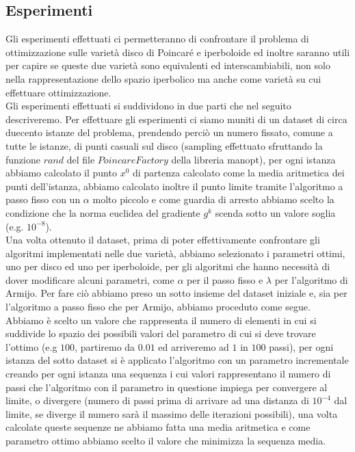 \documentclass[a4paper, 12pt]{article}
\begin{document}
\subsection{Esperimenti}
Gli esperimenti effettuati ci permetteranno di confrontare il problema di ottimizzazione sulle varietà disco di Poincaré e iperboloide ed inoltre saranno utili per capire se queste due varietà sono equivalenti ed interscambiabili, non solo nella rappresentazione dello spazio iperbolico ma anche come varietà su cui effettuare ottimizzazione.\\
Gli esperimenti effettuati si suddividono in due parti che nel seguito descriveremo. Per effettuare gli esperimenti ci siamo muniti di un dataset di circa duecento istanze del problema, prendendo perciò un numero fissato, comune a tutte le istanze, di punti casuali sul disco (sampling effettuato sfruttando la funzione $rand$ del file $PoincareFactory$ della libreria manopt), per ogni istanza abbiamo calcolato il punto $x^0$ di partenza calcolato come la media aritmetica dei punti dell'istanza, abbiamo calcolato inoltre il punto limite tramite l'algoritmo a passo fisso con un $\alpha$ molto piccolo e come guardia di arresto abbiamo scelto la condizione che la norma euclidea del gradiente $g^k$ scenda sotto un valore soglia (e.g. $10^{-8}$).\\
Una volta ottenuto il dataset, prima di poter effettivamente confrontare gli algoritmi implementati nelle due varietà, abbiamo selezionato i parametri ottimi, uno per disco ed uno per iperboloide, per gli algoritmi che hanno necessità di dover modificare alcuni parametri, come $\alpha$ per il passo fisso e $\lambda$ per l'algoritmo di Armijo. Per fare ciò abbiamo preso un sotto insieme del dataset iniziale e, sia per l'algoritmo a passo fisso che per Armijo, abbiamo proceduto come segue. Abbiamo è scelto un valore che rappresenta il numero di elementi in cui si suddivide lo spazio dei possibili valori del parametro di cui si deve trovare  l'ottimo (e.g $100$, partiremo da $0.01$ ed arriveremo ad $1$ in $100$ passi), per ogni istanza del sotto dataset si è applicato l'algoritmo con un parametro incrementale creando per ogni istanza una sequenza i cui valori rappresentano il numero di passi che l'algoritmo con il parametro in questione impiega per convergere al limite, o divergere (numero di passi prima di arrivare ad una distanza di $10^{-4}$ dal limite, se diverge il numero sarà il massimo delle iterazioni possibili), una volta calcolate queste sequenze ne abbiamo fatta una media aritmetica e come parametro ottimo abbiamo scelto il valore che minimizza la sequenza media.\\
\end{document}

